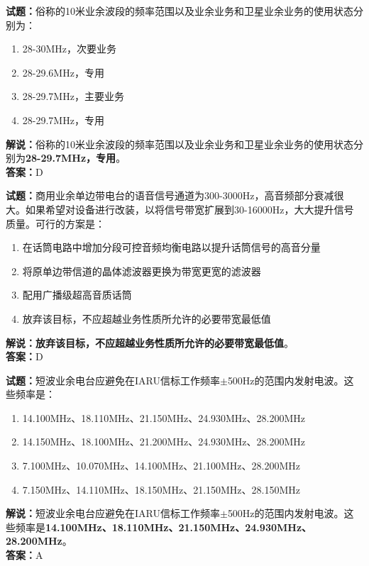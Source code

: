 \documentclass{ctexbook}
\begin{document}
\vspace{\baselineskip}

\noindent\textbf{试题：}俗称的10米业余波段的频率范围以及业余业务和卫星业余业务的使用状态分别为：
\begin{enumerate}[leftmargin=3em]
  \item 28-30\unit{\MHz}，次要业务
  \item 28-29.6\unit{\MHz}，专用
  \item 28-29.7\unit{\MHz}，主要业务
  \item 28-29.7\unit{\MHz}，专用
\end{enumerate}
\noindent\textbf{解说：}俗称的10米业余波段的频率范围以及业余业务和卫星业余业务的使用状态分别为\textbf{28-29.7\unit{\MHz}，专用}。\\\noindent\textbf{答案：}D

\vspace{\baselineskip}

\noindent\textbf{试题：}商用业余单边带电台的语音信号通道为300-3000Hz，高音频部分衰减很大。如果希望对设备进行改装，以将信号带宽扩展到30-16000Hz，大大提升信号质量。可行的方案是：
\begin{enumerate}[leftmargin=3em]
  \item 在话筒电路中增加分段可控音频均衡电路以提升话筒信号的高音分量
  \item 将原单边带信道的晶体滤波器更换为带宽更宽的滤波器
  \item 配用广播级超高音质话筒
  \item 放弃该目标，不应超越业务性质所允许的必要带宽最低值
\end{enumerate}
\noindent\textbf{解说：}\textbf{放弃该目标，不应超越业务性质所允许的必要带宽最低值}。\\\noindent\textbf{答案：}D

\vspace{\baselineskip}

\noindent\textbf{试题：}短波业余电台应避免在IARU信标工作频率$\pm$500Hz的范围内发射电波。这些频率是：%
\begin{enumerate}[leftmargin=3em]
  \item 14.100\unit{\MHz}、18.110\unit{\MHz}、21.150\unit{\MHz}、24.930\unit{\MHz}、28.200\unit{\MHz}
  \item 14.150\unit{\MHz}、18.100\unit{\MHz}、21.200\unit{\MHz}、24.930\unit{\MHz}、28.200\unit{\MHz}
  \item 7.100\unit{\MHz}、10.070\unit{\MHz}、14.100\unit{\MHz}、21.100\unit{\MHz}、28.200\unit{\MHz}
  \item 7.150\unit{\MHz}、14.110\unit{\MHz}、18.150\unit{\MHz}、21.150\unit{\MHz}、28.150\unit{\MHz}
\end{enumerate}
\noindent\textbf{解说：}短波业余电台应避免在IARU信标工作频率$\pm$500Hz的范围内发射电波。这些频率是\textbf{14.100\unit{\MHz}、18.110\unit{\MHz}、21.150\unit{\MHz}、24.930\unit{\MHz}、28.200\unit{\MHz}}。\\\noindent\textbf{答案：}A%
\end{document}
